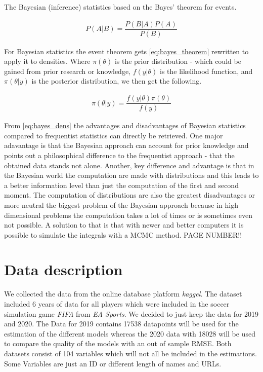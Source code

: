 \documentclass[12pt,a4paper]{article}
\begin{document}
The Bayesian (inference) statistics based on the Bayes' theorem for
events.

\begin{align}
\label{eq:bayes_theorem}
  P(A | B) = \dfrac{P (B | A) P(A)}{P(B)}
\end{align}

For Bayesian statistics the event theorem gets \eqref{eq:bayes_theorem}
rewritten to apply it to densities. Where \(\pi (\theta)\) is the prior
distribution - which could be gained from prior research or knowledge,
\(f(y | \theta )\) is the likelihood function, and \(\pi (\theta| y)\)
is the posterior distribution, we then get the following.

\begin{align}
\label{eq:bayes_dens}
  \pi (\theta | y) = \dfrac{f(y | \theta) \pi(\theta)}{f(y)}
\end{align}

From \eqref{eq:bayes_dens} the advantages and disadvantages of Bayesian
statistics compared to frequentist statistics can directly be retrieved.
One major adavantage is that the Bayesian approach can account for prior
knowledge and points out a philosophical difference to the frequentist
approach - that the obtained data stands not alone. Another, key
difference and advantage is that in the Bayesian world the computation
are made with distributions and this leads to a better information level
than just the computation of the first and second moment. The
computation of distributions are also the greatest disadvantages or more
neutral the biggest problem of the Bayesian approach because in high
dimensional problems the computation takes a lot of times or is
sometimes even not possible. A solution to that is that with newer and
better computers it is possible to simulate the integrals with a
\ac{MCMC} method. \autocite[p.~100]{ghosh_introduction_2006} PAGE
NUMBER!! \newpage

\hypertarget{data-description}{%
\section{Data description}\label{data-description}}

We collected the data from the online database platform \emph{kaggel.}
The dataset included 6 years of data for all players which were included
in the soccer simulation game \emph{FIFA} from \emph{EA Sports}. We
decided to just keep the data for 2019 and 2020. The Data for 2019
contains 17538 datapoints will be used for the estimation of the
different models whereas the 2020 data with 18028 will be used to
compare the quality of the models with an out of sample \ac{RMSE}. Both
datasets consist of 104 variables which will not all be included in the
estimations. Some Variables are just an ID or different length of names
and URLs. \autocite{leone_fifa_2020}
\end{document}
